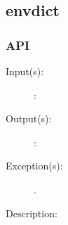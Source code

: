 %
%
%
%
%              

\subsection{envdict}
\label{envdict}

\subsubsection{API}
\begin{description}
\label{envdict_}
\item[{\cfunc[]{envdict\_}{}}: ]
	\begin{description}\item[]
	\item[Input(s): ]
		\begin{description}\item[]
		\item[: ]
		\end{description}
	\item[Output(s): ]
		\begin{description}\item[]
		\item[: ]
		\end{description}
	\item[Exception(s): ]
		\begin{description}\item[]
		\item[.]
		\end{description}
	\item[Description: ]
	\end{description}
\end{description}
